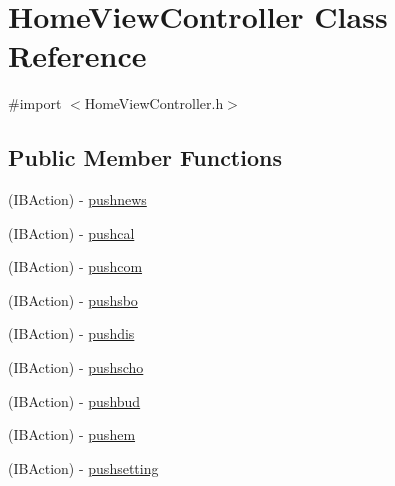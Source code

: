 \hypertarget{interface_home_view_controller}{
\section{\-Home\-View\-Controller \-Class \-Reference}
\label{interface_home_view_controller}
}


{\ttfamily \#import $<$\-Home\-View\-Controller.\-h$>$}

\subsection*{\-Public \-Member \-Functions}
\begin{DoxyCompactItemize}
\item 
(\-I\-B\-Action) -\/ \hyperlink{interface_home_view_controller_ad052f346e6d7759c0736201ff214cb13}{pushnews}
\item 
(\-I\-B\-Action) -\/ \hyperlink{interface_home_view_controller_ac64e0fd9ae1f0608ec9e1c77694ebfd4}{pushcal}
\item 
(\-I\-B\-Action) -\/ \hyperlink{interface_home_view_controller_ad0fe2d65cef91075d1b7532e68afc5cd}{pushcom}
\item 
(\-I\-B\-Action) -\/ \hyperlink{interface_home_view_controller_ab4556858b43d2f379ca42e203448b2cc}{pushsbo}
\item 
(\-I\-B\-Action) -\/ \hyperlink{interface_home_view_controller_aba1d4cd5a5f0bd5b2354c0fcf9f0c8d3}{pushdis}
\item 
(\-I\-B\-Action) -\/ \hyperlink{interface_home_view_controller_adb482ba5ac1aa57ba05003c6535b8d55}{pushscho}
\item 
(\-I\-B\-Action) -\/ \hyperlink{interface_home_view_controller_ace908906c32a0190c033a2bfb7e74efe}{pushbud}
\item 
(\-I\-B\-Action) -\/ \hyperlink{interface_home_view_controller_a87fb4085e20ebe2c323ee20793d57790}{pushem}
\item 
(\-I\-B\-Action) -\/ \hyperlink{interface_home_view_controller_a1971662f55f4cfc8ced057094987be4b}{pushsetting}
\end{DoxyCompactItemize}



